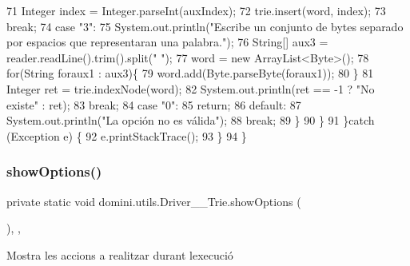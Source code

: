 \begin{DoxyCode}
71                     Integer index = Integer.parseInt(auxIndex);
72                     trie.insert(word, index);
73                 \textcolor{keywordflow}{break};
74                 \textcolor{keywordflow}{case} \textcolor{stringliteral}{"3"}:
75                     System.out.println(\textcolor{stringliteral}{"Escribe un conjunto de bytes separado por espacios que
       representaran una palabra."});
76                     String[] aux3 = reader.readLine().trim().split(\textcolor{stringliteral}{" "});
77                     word = \textcolor{keyword}{new} ArrayList<Byte>();
78                     \textcolor{keywordflow}{for}(String foraux1 : aux3)\{
79                         word.add(Byte.parseByte(foraux1));
80                     \}
81                     Integer ret = trie.indexNode(word);
82                     System.out.println(ret == -1 ? \textcolor{stringliteral}{"No existe"} : ret);
83                 \textcolor{keywordflow}{break};
84                 \textcolor{keywordflow}{case} \textcolor{stringliteral}{"0"}:
85                     \textcolor{keywordflow}{return};
86                 \textcolor{keywordflow}{default}:
87                     System.out.println(\textcolor{stringliteral}{"La opción no es válida"});
88                 \textcolor{keywordflow}{break};
89             \}
90         \}
91     \}\textcolor{keywordflow}{catch} (Exception e) \{
92         e.printStackTrace();
93     \}
94     \}
\end{DoxyCode}
\mbox{\label{classdomini_1_1utils_1_1Driver____Trie_a8b61698744500c2c6ffa92f861162ff5}} 
\subsubsection{\texorpdfstring{show\+Options()}{showOptions()}}
{\footnotesize\ttfamily private static void domini.\+utils.\+Driver\+\_\+\+\_\+\+Trie.\+show\+Options (\begin{DoxyParamCaption}{ }\end{DoxyParamCaption})\hspace{0.3cm}{\ttfamily [inline]}, {\ttfamily [static]}, {\ttfamily [private]}}



Mostra les accions a realitzar durant l\textquotesingle{}execució 


